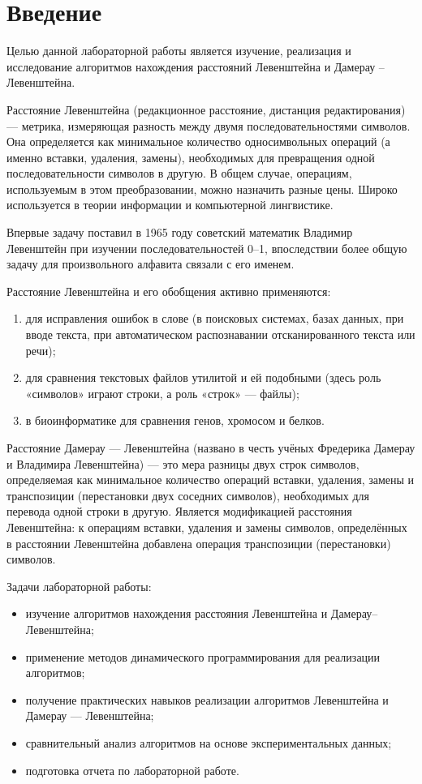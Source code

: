 \chapter*{Введение}

Целью данной лабораторной работы является изучение, реализация и исследование алгоритмов нахождения расстояний Левенштейна и Дамерау -- Левенштейна.

Расстояние Левенштейна (редакционное расстояние, дистанция редактирования) — метрика, измеряющая разность между двумя последовательностями символов. Она определяется как минимальное количество односимвольных операций (а именно вставки, удаления, замены), необходимых для превращения одной последовательности символов в другую. В общем случае, операциям, используемым в этом преобразовании, можно назначить разные цены. Широко используется в теории информации и компьютерной лингвистике.

Впервые задачу поставил в 1965 году советский математик Владимир Левенштейн при изучении последовательностей 0--1, впоследствии более общую задачу для произвольного алфавита связали с его именем.

Расстояние Левенштейна и его обобщения активно применяются: 
\begin{enumerate}[label={\arabic*)}]
	\item для исправления ошибок в слове (в поисковых системах, базах данных, при вводе текста, при автоматическом распознавании отсканированного текста или речи);
	\item для сравнения текстовых файлов утилитой  и ей подобными (здесь роль «символов» играют строки, а роль «строк» — файлы);
	\item в биоинформатике для сравнения генов, хромосом и белков.
\end{enumerate}

Расстояние Дамерау — Левенштейна (названо в честь учёных Фредерика Дамерау и Владимира Левенштейна) — это мера разницы двух строк символов, определяемая как минимальное количество операций вставки, удаления, замены и транспозиции (перестановки двух соседних символов), необходимых для перевода одной строки в другую. Является модификацией расстояния Левенштейна: к операциям вставки, удаления и замены символов, определённых в расстоянии Левенштейна добавлена операция транспозиции (перестановки) символов.

Задачи лабораторной работы:

\begin{itemize}
    \item изучение алгоритмов нахождения расстояния Левенштейна и Дамерау--Левенштейна;
	\item применение методов динамического программирования для реализации алгоритмов;
	\item получение практических навыков реализации алгоритмов Левенштейна и Дамерау — Левенштейна;
	\item сравнительный анализ алгоритмов на основе экспериментальных данных;
	\item подготовка отчета по лабораторной работе.
\end{itemize}
